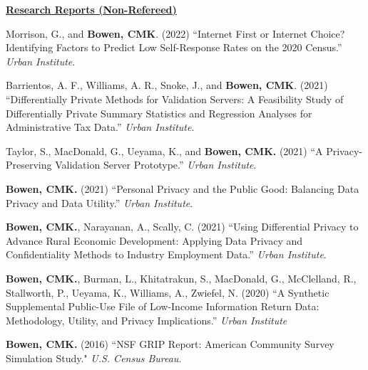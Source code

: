 \documentclass[11pt, letterpaper, roman]{moderncv} %
\begin{document}
\vspace{6pt}
\noindent\underline{\textbf{Research Reports (Non-Refereed)}}
\vspace{4pt}
\begin{etaremune}[topsep=0pt, itemsep=4pt, partopsep=0pt, parsep=0pt]
    \item Morrison, G., and \textbf{Bowen, CMK}. (2022) ``Internet First or Internet Choice? Identifying Factors to Predict Low Self-Response Rates on the 2020 Census.'' \textit{Urban Institute}.
    
    \item Barrientos, A. F., Williams, A. R., Snoke, J., and \textbf{Bowen, CMK}. (2021) ``Differentially Private Methods for Validation Servers: A Feasibility Study of Differentially Private Summary Statistics and Regression Analyses for Administrative Tax Data.'' \textit{Urban Institute}.
    
    \item Taylor, S., MacDonald, G., Ueyama, K., and \textbf{Bowen, CMK.} (2021) ``A Privacy-Preserving Validation Server Prototype.'' \textit{Urban Institute}.
        
    \item \textbf{Bowen, CMK.} (2021) ``Personal Privacy and the Public Good: Balancing Data Privacy and Data Utility.'' \textit{Urban Institute}.
    
    \item \textbf{Bowen, CMK.}, Narayanan, A., Scally, C. (2021) ``Using Differential Privacy to Advance Rural Economic Development: Applying Data Privacy and Confidentiality Methods to Industry Employment Data.'' \textit{Urban Institute}.
    
    \item \textbf{Bowen, CMK.}, Burman, L., Khitatrakun, S., MacDonald, G., McClelland, R., Stallworth, P., Ueyama, K., Williams, A., Zwiefel, N. (2020) ``A Synthetic Supplemental Public-Use File of Low-Income Information Return Data: Methodology, Utility, and Privacy Implications.'' \textit{Urban Institute}
    
    \item \textbf{Bowen, CMK.} (2016) ``NSF GRIP Report: American Community Survey Simulation Study." \textit{U.S. Census Bureau}.  
\end{etaremune}
\end{document}
